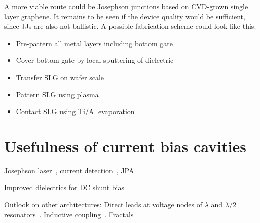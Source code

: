 A more viable route could be Josephson junctions based on CVD-grown single layer graphene.
%
It remains to be seen if the device quality would be sufficient, since  JJs are also not ballistic.
%
A possible fabrication scheme could look like this:
%
\begin{itemize}
	\item Pre-pattern all metal layers including bottom gate
	\item Cover bottom gate by local sputtering of dielectric
	\item Transfer SLG on wafer scale
	\item Pattern SLG using  plasma
	\item Contact SLG using Ti/Al evaporation
\end{itemize}


\section{Usefulness of current bias cavities}

Josephson laser~\cite{chenRealizationSingleCooperpairJosephson2014c,cassidyDemonstrationAcJosephson2017e}, current detection~\cite{kherKineticInductanceParametric2016,kherSuperconductingNonlinearKinetic2017}, JPA~\cite{hoeomWidebandLownoiseSuperconducting2012d}

Improved dielectrics for DC shunt bias~\cite{adamyanTunableSuperconductingMicrostrip2016}

Outlook on other architectures:
%
Direct leads at voltage nodes of $\lambda$ and $\lambda/2$ resonators~\cite{chenIntroductionDcBias2011a,liApplyingDirectCurrent2013}.
%
Inductive coupling~\cite{vissersFrequencytunableSuperconductingResonators2015b}.
%
Fractals~\cite{mahashabdeFastTunableHigh2020}

